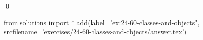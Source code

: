 
\begin{ex}
  \label{ex:24-60-classes-and-objects}
  
  \qed
\end{ex}
\begin{python0}
from solutions import *
add(label="ex:24-60-classes-and-objects",
    srcfilename='exercises/24-60-classes-and-objects/answer.tex')
\end{python0}
